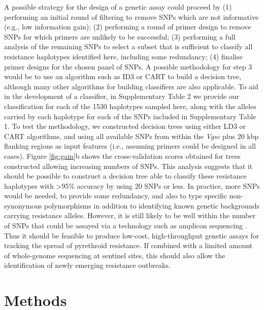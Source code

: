 \documentclass[a4paper,11pt,abstracton,hidelinks]{scrartcl}
\begin{document}
%
A possible strategy for the design of a genetic assay could proceed by (1) performing an initial round of filtering to remove SNPs which are not informative (e.g., low information gain); (2) performing a round of primer design to remove SNPs for which primers are unlikely to be successful; (3) performing a full analysis of the remaining SNPs to select a subset that is sufficient to classify all resistance haplotypes identified here, including some redundancy; (4) finalise primer designs for the chosen panel of SNPs.
%
A possible methodology for step 3 would be to use an algorithm such as ID3 \cite{Quinlan1986} or CART \cite{Breiman1984} to build a decision tree, although many other algorithms for building classifiers are also applicable.
%
To aid in the development of a classifier, in Supplementary Table 2 we provide our classification for each of the 1530 haplotypes sampled here, along with the alleles carried by each haplotype for each of the SNPs included in Supplementary Table 1.
%
To test the methodology, we constructed decision trees using either LD3 or CART algorithms, and using all available SNPs from within the \textit{Vgsc} plus 20 kbp flanking regions as input features (i.e., assuming primers could be designed in all cases).
%
Figure \ref{fig:gain}b shows the cross-validation scores obtained for trees constructed allowing increasing numbers of SNPs.
%
This analysis suggests that it should be possible to construct a decision tree able to classify these resistance haplotypes with >95\% accuracy by using 20 SNPs or less.
%
In practice, more SNPs would be needed, to provide some redundancy, and also to type specific non-synonymous polymorphisms in addition to identifying known genetic backgrounds carrying resistance alleles.
%
However, it is still likely to be well within the number of SNPs that could be assayed via a technology such as amplicon sequencing \cite{Kilianski2015}.
%
Thus it should be feasible to produce low-cost, high-throughput genetic assays for tracking the spread of pyrethroid resistance.
%
If combined with a limited amount of whole-genome sequencing at sentinel sites, this should also allow the identification of newly emerging resistance outbreaks.
%



\section*{Methods}
\end{document}
